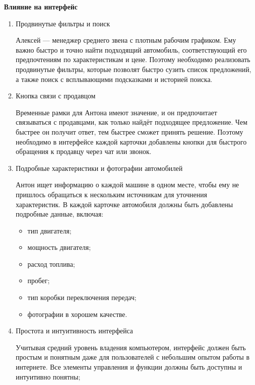 \textbf{Влияние на интерфейс}
\bigskip

\begin{enumerate}
    \item Продвинутые фильтры и поиск

        Алексей — менеджер среднего звена с плотным рабочим графиком. Ему важно быстро и точно найти подходящий автомобиль, соответствующий его предпочтениям по характеристикам и цене. Поэтому необходимо реализовать продвинутые фильтры, которые позволят быстро сузить список предложений, а также поиск с всплывающими подсказками и историей поиска.

    \item Кнопка связи с продавцом

        Временные рамки для Антона имеют значение, и он предпочитает связываться с продавцами, как только найдёт подходящее предложение. Чем быстрее он получит ответ, тем быстрее сможет принять решение. Поэтому необходимо в интерфейсе каждой карточки добавлены кнопки для быстрого обращения к продавцу через чат или звонок.

    \item Подробные характеристики и фотографии автомобилей

        Антон ищет информацию о каждой машине в одном месте, чтобы ему не пришлось обращаться к нескольким источникам для уточнения характеристик. В каждой карточке автомобиля должны быть добавлены подробные данные, включая:

    \begin{itemize}
        \item тип двигателя;
        \item мощность двигателя;
        \item расход топлива;
        \item пробег;
        \item тип коробки переключения передач;
        \item фотографии в хорошем качестве.
    \end{itemize}

    \item Простота и интуитивность интерфейса

        Учитывая средний уровень владения компьютером, интерфейс должен быть простым и понятным даже для пользователей с небольшим опытом работы в интернете. Все элементы управления и функции должны быть доступны и интуитивно понятны;
\end{enumerate}

